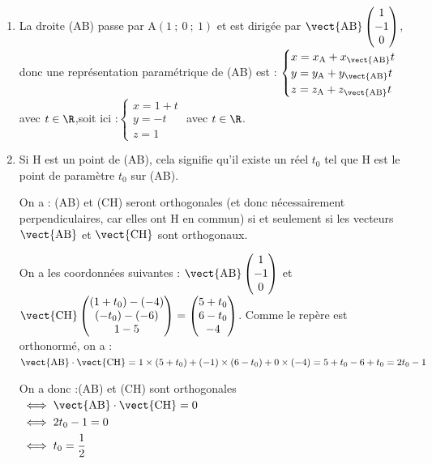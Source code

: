 \begin{enumerate}
	\item La droite (AB) passe par A$(1~;~0~;~1)$ et est dirigée par $\vect{\mathrm{AB}} \begin{pmatrix}1\\-1\\0\end{pmatrix}$, donc une représentation paramétrique de (AB) est :
	\quad
	$\begin{cases}x = x_\mathrm{A} + x_{\mathrm{\vect{\mathrm{AB}}}}t\\y = y_\mathrm{A} + y_{\mathrm{\vect{\mathrm{AB}}}}t\\z = z _\mathrm{A} + z _{\mathrm{\vect{\mathrm{AB}}}}t \end{cases}$ avec $t \in\R$,\quad soit ici :\quad $\begin{cases} x = 1 + t\\y= -t\\z = 1	\end{cases}$ avec $t \in \R$.

	\item Si H est un point de (AB), cela signifie qu'il existe un réel $t_0$ tel que H est le point de paramètre $t_0$ sur (AB).

On a : (AB) et (CH) seront orthogonales (et donc nécessairement perpendiculaires, car elles ont H en commun) si et seulement si les vecteurs $\vect{\mathrm{AB}}$ et $\vect{\mathrm{CH}}$ sont orthogonaux.

On a les coordonnées suivantes : \quad $\vect{\mathrm{AB}} \begin{pmatrix}1\\-1\\0\end{pmatrix}$ et $\vect{\mathrm{CH}}\begin{pmatrix}(1 + t_0) - (-4)\\(-t_0) - (-6) \\1 - 5\end{pmatrix} =\begin{pmatrix}5 + t_0 \\ 6 - t_0 \\ -4\end{pmatrix}$. Comme le repère est orthonormé, on a :\quad $\vect{\mathrm{AB}}\cdot\vect{\mathrm{CH}} = 1\times (5 + t_0) + (-1) \times (6 - t_0) + 0\times (-4) = 5 + t_0 - 6 + t_0 = 2t_0 - 1$

On a donc :\quad (AB) et (CH) sont orthogonales $\begin{aligned}[t] &\iff \vect{\mathrm{AB}}\cdot \vect{\mathrm{CH}} = 0\\
	&\iff 2t_0 - 1 = 0\\
	&\iff t_0 = \dfrac{1}{2}\end{aligned}$


\end{enumerate}

